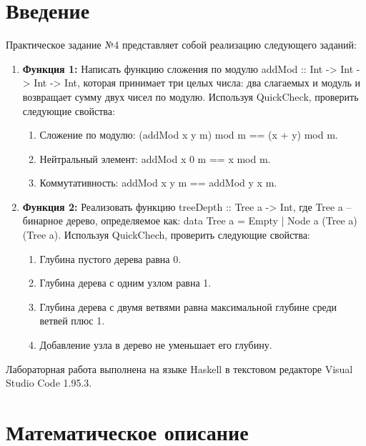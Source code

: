 \documentclass[11pt,a4paper,final]{article} %
\begin{document}
\newpage

\tableofcontents

\newpage
\section*{Введение}
Практическое задание №4 представляет собой реализацию следующего заданий: 

\begin{enumerate}

	\item \textbf{Функция 1:} Написать функцию сложения по модулю addMod :: Int -> Int -> Int -> Int, которая принимает три целых числа: два слагаемых и модуль и возвращает сумму двух чисел по модулю. Используя QuickCheck, проверить следующие свойства:
	\begin{enumerate}
		\item Сложение по модулю: (addMod x y m) mod m == (x + y) mod m.
		\item Нейтральный элемент: addMod x 0 m == x mod m.
		\item Коммутативность: addMod x y m == addMod y x m.
	\end{enumerate}
	
	\item \textbf{Функция 2:} Реализовать функцию treeDepth :: Tree a -> Int, где Tree a -- бинарное дерево, определяемое как: data Tree a = Empty | Node a (Tree a)(Tree a). Используя QuickChech, проверить следующие свойства:
	
	\begin{enumerate}
		\item Глубина пустого дерева равна 0.
		\item Глубина дерева с одним узлом равна 1.
		\item Глубина дерева с двумя ветвями равна максимальной глубине среди ветвей плюс 1.
		\item Добавление узла в дерево не уменьшает его глубину.
	\end{enumerate}
\end{enumerate}

\par Лабораторная работа выполнена на языке Haskell в текстовом редакторе Visual Studio Code 1.95.3.


\newpage
\section {Математическое описание}
\end{document}
